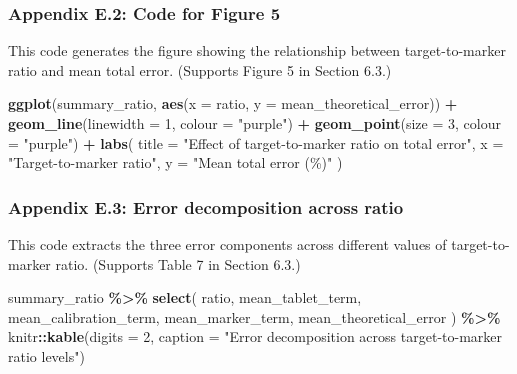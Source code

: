 \documentclass[
  12pt,
]{article}
\newenvironment{Shaded}{\begin{snugshade}}{\end{snugshade}}
\newcommand{\AttributeTok}[1]{\textcolor[rgb]{0.13,0.29,0.53}{#1}}
\newcommand{\DecValTok}[1]{\textcolor[rgb]{0.00,0.00,0.81}{#1}}
\newcommand{\FunctionTok}[1]{\textcolor[rgb]{0.13,0.29,0.53}{\textbf{#1}}}
\newcommand{\NormalTok}[1]{#1}
\newcommand{\SpecialCharTok}[1]{\textcolor[rgb]{0.81,0.36,0.00}{\textbf{#1}}}
\newcommand{\StringTok}[1]{\textcolor[rgb]{0.31,0.60,0.02}{#1}}
\begin{document}
\subsubsection{Appendix E.2: Code for Figure
5}\label{appendix-e.2-code-for-figure-5}

This code generates the figure showing the relationship between
target-to-marker ratio and mean total error. (Supports Figure 5 in
Section 6.3.)

\begin{Shaded}
\begin{Highlighting}[]
\FunctionTok{ggplot}\NormalTok{(summary\_ratio, }\FunctionTok{aes}\NormalTok{(}\AttributeTok{x =}\NormalTok{ ratio, }\AttributeTok{y =}\NormalTok{ mean\_theoretical\_error)) }\SpecialCharTok{+}
  \FunctionTok{geom\_line}\NormalTok{(}\AttributeTok{linewidth =} \DecValTok{1}\NormalTok{, }\AttributeTok{colour =} \StringTok{"purple"}\NormalTok{) }\SpecialCharTok{+}
  \FunctionTok{geom\_point}\NormalTok{(}\AttributeTok{size =} \DecValTok{3}\NormalTok{, }\AttributeTok{colour =} \StringTok{"purple"}\NormalTok{) }\SpecialCharTok{+}
  \FunctionTok{labs}\NormalTok{(}
    \AttributeTok{title =} \StringTok{"Effect of target{-}to{-}marker ratio on total error"}\NormalTok{,}
    \AttributeTok{x =} \StringTok{"Target{-}to{-}marker ratio"}\NormalTok{,}
    \AttributeTok{y =} \StringTok{"Mean total error (\%)"}
\NormalTok{  )}
\end{Highlighting}
\end{Shaded}

\subsubsection{Appendix E.3: Error decomposition across
ratio}\label{appendix-e.3-error-decomposition-across-ratio}

This code extracts the three error components across different values of
target-to-marker ratio. (Supports Table 7 in Section 6.3.)

\begin{Shaded}
\begin{Highlighting}[]
\NormalTok{summary\_ratio }\SpecialCharTok{\%\textgreater{}\%}
  \FunctionTok{select}\NormalTok{(}
\NormalTok{    ratio,}
\NormalTok{    mean\_tablet\_term,}
\NormalTok{    mean\_calibration\_term,}
\NormalTok{    mean\_marker\_term,}
\NormalTok{    mean\_theoretical\_error}
\NormalTok{  ) }\SpecialCharTok{\%\textgreater{}\%}
\NormalTok{  knitr}\SpecialCharTok{::}\FunctionTok{kable}\NormalTok{(}\AttributeTok{digits =} \DecValTok{2}\NormalTok{, }\AttributeTok{caption =} 
      \StringTok{"Error decomposition across }
\StringTok{      target{-}to{-}marker ratio levels"}\NormalTok{)}
\end{Highlighting}
\end{Shaded}
\end{document}
